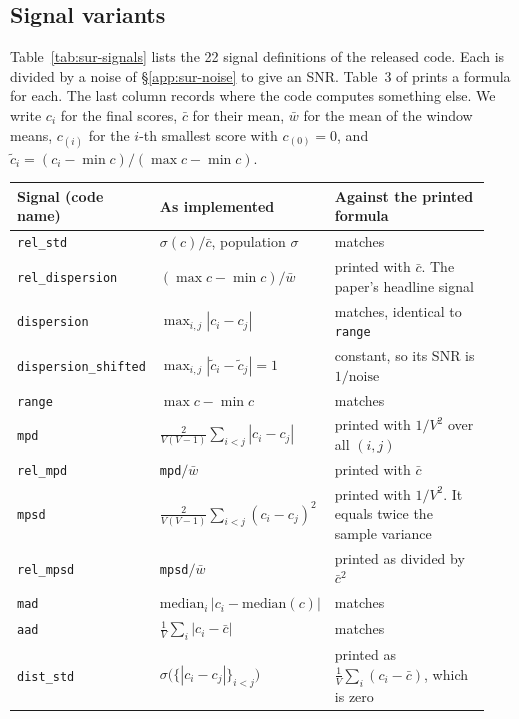 \subsection{Signal variants}
\label{app:sur-signals}
\label{app:measuring-signal}

Table~\ref{tab:sur-signals} lists the 22 signal definitions of the released code.
Each is divided by a noise of \S\ref{app:sur-noise} to give an SNR.
Table~3 of \citet{heineman_signal_2025} prints a formula for each. The last column records where the code computes something else.
We write $c_i$ for the final scores, $\bar{c}$ for their mean, $\bar{w}$ for the mean of the window means, $c_{(i)}$ for the $i$-th smallest score with $c_{(0)} = 0$, and $\tilde{c}_i = (c_i - \min c)/(\max c - \min c)$.

\begin{table}[t]
\centering
\scriptsize
\begin{tabular}{@{}p{0.19\linewidth}p{0.36\linewidth}p{0.39\linewidth}@{}}
\toprule
\textbf{Signal (code name)} & \textbf{As implemented} & \textbf{Against the printed formula} \\
\midrule
\texttt{rel\_std} & $\sigma(c)/\bar{c}$, population $\sigma$ & matches \\
\texttt{rel\_dispersion} & $(\max c - \min c)/\bar{w}$ & printed with $\bar{c}$. The paper's headline signal \\
\texttt{dispersion} & $\max_{i,j}|c_i - c_j|$ & matches, identical to \texttt{range} \\
\texttt{dispersion\_shifted} & $\max_{i,j}|\tilde{c}_i - \tilde{c}_j| = 1$ & constant, so its SNR is $1/\text{noise}$ \\
\texttt{range} & $\max c - \min c$ & matches \\
\texttt{mpd} & $\frac{2}{V(V-1)}\sum_{i<j}|c_i - c_j|$ & printed with $1/V^2$ over all $(i,j)$ \\
\texttt{rel\_mpd} & \texttt{mpd}$/\bar{w}$ & printed with $\bar{c}$ \\
\texttt{mpsd} & $\frac{2}{V(V-1)}\sum_{i<j}(c_i - c_j)^2$ & printed with $1/V^2$. It equals twice the sample variance \\
\texttt{rel\_mpsd} & \texttt{mpsd}$/\bar{w}$ & printed as divided by $\bar{c}^2$ \\
\texttt{mad} & $\mathrm{median}_i\,|c_i - \mathrm{median}(c)|$ & matches \\
\texttt{aad} & $\frac{1}{V}\sum_i |c_i - \bar{c}|$ & matches \\
\texttt{dist\_std} & $\sigma\big(\{|c_i - c_j|\}_{i<j}\big)$ & printed as $\frac{1}{V}\sum_i (c_i - \bar{c})$, which is zero \\

\end{tabular}
\end{table}
